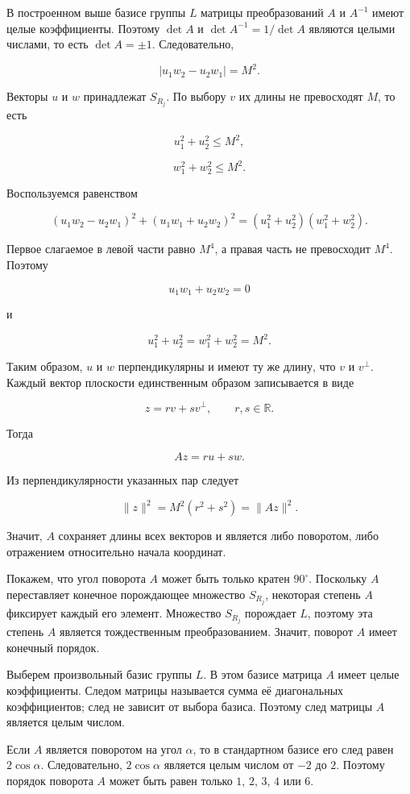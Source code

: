 В построенном выше базисе группы $L$ матрицы преобразований $A$ и
$A^{-1}$ имеют целые коэффициенты. Поэтому $\det A$ и
$\det A^{-1}=1/\det A$ являются целыми числами, то есть
$\det A=\pm1$. Следовательно,

$$|u_1w_2-u_2w_1|=M^2.$$

Векторы $u$ и $w$ принадлежат $S_{R_j}$. По выбору $v$ их длины не
превосходят $M$, то есть

$$u_1^2+u_2^2\leq M^2,$$

$$w_1^2+w_2^2\leq M^2.$$

Воспользуемся равенством

$$
(u_1w_2-u_2w_1)^2+(u_1w_1+u_2w_2)^2
=(u_1^2+u_2^2)(w_1^2+w_2^2).
$$

Первое слагаемое в левой части равно $M^4$, а правая часть не превосходит
$M^4$. Поэтому

$$u_1w_1+u_2w_2=0$$

и

$$u_1^2+u_2^2=w_1^2+w_2^2=M^2.$$

Таким образом, $u$ и $w$ перпендикулярны и имеют ту же длину, что $v$ и
$v^\perp$. Каждый вектор плоскости единственным образом записывается в виде

$$z=rv+sv^\perp,\qquad r,s\in\mathbb R.$$

Тогда

$$Az=ru+sw.$$

Из перпендикулярности указанных пар следует

$$\lVert z\rVert^2=M^2(r^2+s^2)=\lVert Az\rVert^2.$$

Значит, $A$ сохраняет длины всех векторов и является либо поворотом, либо
отражением относительно начала координат.

Покажем, что угол поворота $A$ может быть только кратен $90^\circ$.
Поскольку $A$ переставляет конечное порождающее множество $S_{R_j}$,
некоторая степень $A$ фиксирует каждый его элемент. Множество $S_{R_j}$
порождает $L$, поэтому эта степень $A$ является тождественным
преобразованием. Значит, поворот $A$ имеет конечный порядок.

Выберем произвольный базис группы $L$. В этом базисе матрица $A$ имеет целые
коэффициенты. Следом матрицы называется сумма её диагональных коэффициентов;
след не зависит от выбора базиса. Поэтому след матрицы $A$ является целым
числом.

Если $A$ является поворотом на угол $\alpha$, то в стандартном базисе его
след равен $2\cos\alpha$. Следовательно, $2\cos\alpha$ является целым числом
от $-2$ до $2$. Поэтому порядок поворота $A$ может быть равен только $1$,
$2$, $3$, $4$ или $6$.

